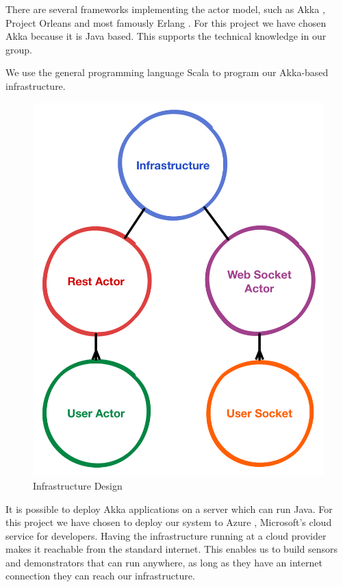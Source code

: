 \documentclass{sigchi}
\begin{document}
There are several frameworks implementing the actor model, such as Akka \cite{akka}, Project Orleans \cite{orleans} and most famously Erlang \cite{erlang}.
For this project we have chosen Akka because it is Java based.
This supports the technical knowledge in our group.

We use the general programming language Scala \cite{scala} to program our Akka-based infrastructure.


\begin{figure}[H]
  \centering
  \includegraphics[width=\columnwidth]{figures/infrastructure_design.pdf}
  \caption{Infrastructure Design}
  \label{fig:infrastructure}
\end{figure}

It is possible to deploy Akka applications on a server which can run Java.
For this project we have chosen to deploy our system to Azure \cite{azure}, Microsoft's cloud service for developers.
Having the infrastructure running at a cloud provider makes it reachable from the standard internet.
This enables us to build sensors and demonstrators that can run anywhere, as long as they have an internet connection they can reach our infrastructure.
\end{document}
